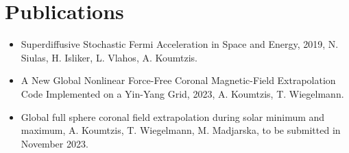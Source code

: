 \documentclass[11pt,a4paper]{article}
\begin{document}
	\section{Publications}
	\begin{itemize}
		\item Superdiffusive Stochastic Fermi Acceleration in Space and Energy, 2019, N. Siulas, H. Isliker, L. Vlahos, A. Koumtzis.
		\item A New Global Nonlinear Force-Free Coronal Magnetic-Field Extrapolation Code Implemented on a Yin-Yang Grid, 2023, A. Koumtzis, T. Wiegelmann.
		\item Global full sphere coronal field extrapolation during solar minimum and maximum, A. Koumtzis, T. Wiegelmann, M. Madjarska, to be submitted in November 2023.
	\end{itemize}
	
\end{document}
